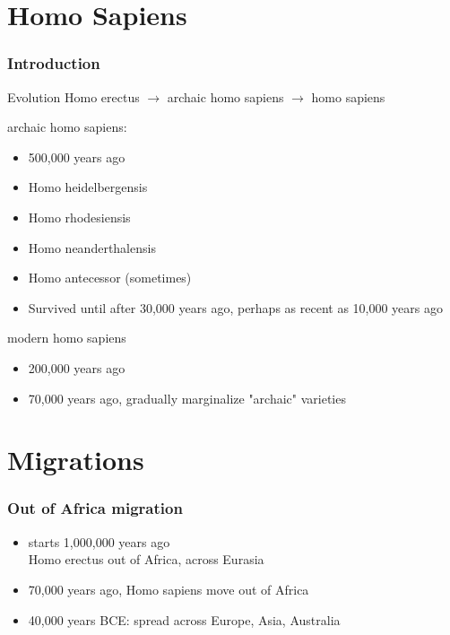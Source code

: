 \section{Homo Sapiens}
\begin{frame}\frametitle{Introduction}\logoEvolution
	\begin{block}{Evolution}
		Homo erectus $\rightarrow$ archaic homo sapiens $\rightarrow$ homo sapiens\\
	\end{block}
	archaic homo sapiens: 
	\begin{itemize}
		\item 500,000  years ago
		\item Homo heidelbergensis
		\item Homo rhodesiensis
		\item Homo neanderthalensis
		\item Homo antecessor (sometimes)
		\item Survived until after 30,000 years ago, perhaps as recent as 10,000 years ago
	\end{itemize}	
	modern homo sapiens
	\begin{itemize} 
		\item 200,000 years ago
		\item 70,000 years ago, gradually marginalize "archaic" varieties
	\end{itemize}
\end{frame}



\section{Migrations}

\begin{frame}\frametitle{Out of Africa migration}\logoEvolution
	\begin{itemize} 
		\item starts 1,000,000 years ago\\
		Homo erectus out of Africa, across Eurasia
		\item 70,000 years ago, Homo sapiens move out of Africa 
		\item 40,000 years BCE: spread across Europe, Asia, Australia
	\end{itemize}
\end{frame}



